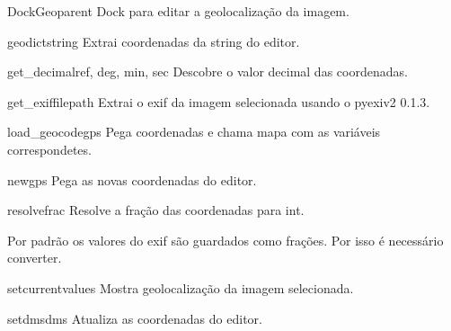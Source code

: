 \documentclass[letterpaper,10pt,portuguese]{manual}
\begin{document}
\hypertarget{veliger.DockGeo}{}\begin{classdesc}{DockGeo}{parent}
Dock para editar a geolocalização da imagem.

\hypertarget{veliger.DockGeo.geodict}{}\begin{methoddesc}{geodict}{string}
Extrai coordenadas da string do editor.
\end{methoddesc}

\hypertarget{veliger.DockGeo.get\_decimal}{}\begin{methoddesc}{get\_decimal}{ref, deg, min, sec}
Descobre o valor decimal das coordenadas.
\end{methoddesc}

\hypertarget{veliger.DockGeo.get\_exif}{}\begin{methoddesc}{get\_exif}{filepath}
Extrai o exif da imagem selecionada usando o pyexiv2 0.1.3.
\end{methoddesc}

\hypertarget{veliger.DockGeo.load\_geocode}{}\begin{methoddesc}{load\_geocode}{gps}
Pega coordenadas e chama mapa com as variáveis correspondetes.
\end{methoddesc}

\hypertarget{veliger.DockGeo.newgps}{}\begin{methoddesc}{newgps}{}
Pega as novas coordenadas do editor.
\end{methoddesc}

\hypertarget{veliger.DockGeo.resolve}{}\begin{methoddesc}{resolve}{frac}
Resolve a fração das coordenadas para int.

Por padrão os valores do exif são guardados como frações. Por isso é
necessário converter.
\end{methoddesc}

\hypertarget{veliger.DockGeo.setcurrent}{}\begin{methoddesc}{setcurrent}{values}
Mostra geolocalização da imagem selecionada.
\end{methoddesc}

\hypertarget{veliger.DockGeo.setdms}{}\begin{methoddesc}{setdms}{dms}
Atualiza as coordenadas do editor.
\end{methoddesc}


\end{classdesc}
\end{document}
